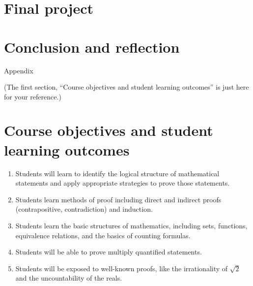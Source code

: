 \documentclass{article}
\theoremstyle{definition}
\begin{document}
\section{Final project}

\section{Conclusion and reflection}

\pagebreak
\appendix
\begin{center}
    \LARGE Appendix
\end{center}
\noindent (The first section, ``Course objectives and student learning outcomes'' is just here for your reference.)
\section{Course objectives and student learning outcomes}

\begin{enumerate}
    \item Students will learn to identify the logical structure of mathematical statements and apply appropriate strategies to prove those statements.
    \item Students learn methods of proof including direct and indirect proofs (contrapositive, contradiction) and induction.
    \item Students learn the basic structures of mathematics, including sets, functions, equivalence relations, and the basics of counting formulas.
    \item Students will be able to prove multiply quantified statements.
    \item Students will be exposed to well-known proofs, like the irrationality of $\sqrt{2}$ and the uncountability of the reals.
\end{enumerate}
\end{document}
